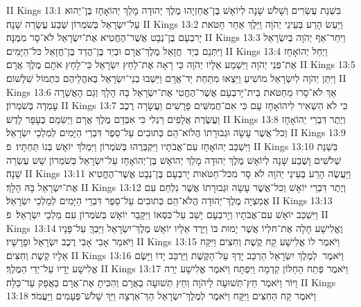 II Kings 13:1	בִּשְׁנַת עֶשְׂרִים וְשָׁלֹשׁ שָׁנָה לְיוֹאָשׁ בֶּן־אֲחַזְיָהוּ מֶלֶךְ יְהוּדָה מָלַךְ יְהוֹאָחָז בֶּן־יֵהוּא עַל־יִשְׂרָאֵל בְּשֹׁמְרוֹן שְׁבַע עֶשְׂרֵה שָׁנָה׃
II Kings 13:2	וַיַּעַשׂ הָרַע בְּעֵינֵי יְהֹוָה וַיֵּלֶךְ אַחַר חַטֹּאת יָרבְעָם בֶּן־נְבָט אֲשֶׁר־הֶחֱטִיא אֶת־יִשְׂרָאֵל לֹא־סָר מִמֶּנָּה׃
II Kings 13:3	וַיִּחַר־אַף יְהֹוָה בְּיִשְׂרָאֵל וַיִּתְּנֵם בְּיַד  חֲזָאֵל מֶלֶךְ־אֲרָם וּבְיַד בֶּן־הֲדַד בֶּן־חֲזָאֵל כּל־הַיָּמִים׃
II Kings 13:4	וַיְחַל יְהוֹאָחָז אֶת־פְּנֵי יְהֹוָה וַיִּשְׁמַע אֵלָיו יְהֹוָה כִּי רָאָה אֶת־לַחַץ יִשְׂרָאֵל כִּי־לָחַץ אֹתָם מֶלֶךְ אֲרָם׃
II Kings 13:5	וַיִּתֵּן יְהֹוָה לְיִשְׂרָאֵל מוֹשִׁיעַ וַיֵּצְאוּ מִתַּחַת יַד־אֲרָם וַיֵּשְׁבוּ בְנֵי־יִשְׂרָאֵל בְּאהֳלֵיהֶם כִּתְמוֹל שִׁלְשׁוֹם׃
II Kings 13:6	אַךְ לֹא־סָרוּ מֵחַטֹּאת בֵּית־יָרבְעָם אֲשֶׁר־הֶחֱטִי אֶת־יִשְׂרָאֵל בָּהּ הָלָךְ וְגַם הָאֲשֵׁרָה עָמְדָה בְּשֹׁמְרוֹן׃
II Kings 13:7	כִּי לֹא הִשְׁאִיר לִיהוֹאָחָז עָם כִּי אִם־חֲמִשִּׁים פָּרָשִׁים וַעֲשָׂרָה רֶכֶב וַעֲשֶׂרֶת אֲלָפִים רַגְלִי כִּי אִבְּדָם מֶלֶךְ אֲרָם וַיְשִׂמֵם כֶּעָפָר לָדֻשׁ׃
II Kings 13:8	וְיֶתֶר דִּבְרֵי יְהוֹאָחָז וְכל־אֲשֶׁר עָשָׂה וּגְבוּרָתוֹ הֲלוֹא־הֵם כְּתוּבִים עַל־סֵפֶר דִּבְרֵי הַיָּמִים לְמַלְכֵי יִשְׂרָאֵל׃
II Kings 13:9	וַיִּשְׁכַּב יְהוֹאָחָז עִם־אֲבֹתָיו וַיִּקְבְּרֻהוּ בְּשֹׁמְרוֹן וַיִּמְלֹךְ יוֹאָשׁ בְּנוֹ תַּחְתָּיו׃ {פ}
II Kings 13:10	בִּשְׁנַת שְׁלֹשִׁים וָשֶׁבַע שָׁנָה לְיוֹאָשׁ מֶלֶךְ יְהוּדָה מָלַךְ יְהוֹאָשׁ בֶּן־יְהוֹאָחָז עַל־יִשְׂרָאֵל בְּשֹׁמְרוֹן שֵׁשׁ עֶשְׂרֵה שָׁנָה׃
II Kings 13:11	וַיַּעֲשֶׂה הָרַע בְּעֵינֵי יְהֹוָה לֹא סָר מִכּל־חַטֹּאות יָרבְעָם בֶּן־נְבָט אֲשֶׁר־הֶחֱטִיא אֶת־יִשְׂרָאֵל בָּהּ הָלָךְ׃
II Kings 13:12	וְיֶתֶר דִּבְרֵי יוֹאָשׁ וְכל־אֲשֶׁר עָשָׂה וּגְבוּרָתוֹ אֲשֶׁר נִלְחַם עִם אֲמַצְיָה מֶלֶךְ־יְהוּדָה הֲלֹא־הֵם כְּתוּבִים עַל־סֵפֶר דִּבְרֵי הַיָּמִים לְמַלְכֵי יִשְׂרָאֵל׃
II Kings 13:13	וַיִּשְׁכַּב יוֹאָשׁ עִם־אֲבֹתָיו וְיָרבְעָם יָשַׁב עַל־כִּסְאוֹ וַיִּקָּבֵר יוֹאָשׁ בְּשֹׁמְרוֹן עִם מַלְכֵי יִשְׂרָאֵל׃ {פ}
II Kings 13:14	וֶאֱלִישָׁע חָלָה אֶת־חלְיוֹ אֲשֶׁר יָמוּת בּוֹ וַיֵּרֶד אֵלָיו יוֹאָשׁ מֶלֶךְ־יִשְׂרָאֵל וַיֵּבְךְּ עַל־פָּנָיו וַיֹּאמַר אָבִי  אָבִי רֶכֶב יִשְׂרָאֵל וּפָרָשָׁיו׃
II Kings 13:15	וַיֹּאמֶר לוֹ אֱלִישָׁע קַח קֶשֶׁת וְחִצִּים וַיִּקַּח אֵלָיו קֶשֶׁת וְחִצִּים׃
II Kings 13:16	וַיֹּאמֶר  לְמֶלֶךְ יִשְׂרָאֵל הַרְכֵּב יָדְךָ עַל־הַקֶּשֶׁת וַיַּרְכֵּב יָדוֹ וַיָּשֶׂם אֱלִישָׁע יָדָיו עַל־יְדֵי הַמֶּלֶךְ׃
II Kings 13:17	וַיֹּאמֶר פְּתַח הַחַלּוֹן קֵדְמָה וַיִּפְתָּח וַיֹּאמֶר אֱלִישָׁע יְרֵה וַיּוֹר וַיֹּאמֶר חֵץ־תְּשׁוּעָה לַיהֹוָה וְחֵץ תְּשׁוּעָה בַאֲרָם וְהִכִּיתָ אֶת־אֲרָם בַּאֲפֵק עַד־כַּלֵּה׃
II Kings 13:18	וַיֹּאמֶר קַח הַחִצִּים וַיִּקָּח וַיֹּאמֶר לְמֶלֶךְ־יִשְׂרָאֵל הַךְ־אַרְצָה וַיַּךְ שָׁלֹשׁ־פְּעָמִים וַיַּעֲמֹד׃
